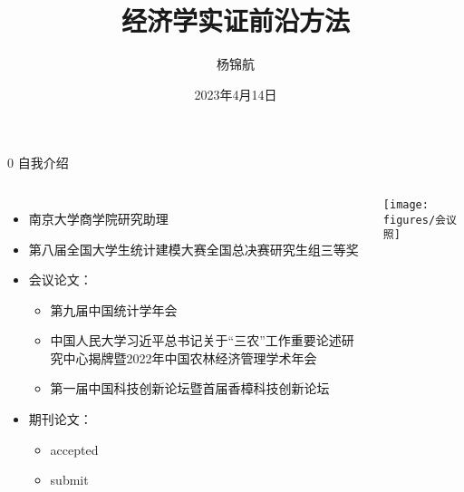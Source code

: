 \documentclass{beamer}%
\title[首届研究生学术文化节]{经济学实证前沿方法}
\author{\noindent 杨锦航}
\institute[研2101]
{
	\noindent 天津财经大学统计学院\\
	\medskip
	\noindent \textit{ y\_jinhang@stu.tjufe.edu.cn}
}
\date{\noindent 2023年4月14日}
\begin{document}
	\begin{frame}
        \setlength{\parindent}{0pt}%
		\titlepage %
	\end{frame}

\begin{frame}[t]{0 自我介绍}
\begin{columns}[onlytextwidth]
\begin{itemize}
  \item 南京大学商学院研究助理
  \item 第八届全国大学生统计建模大赛全国总决赛研究生组三等奖
  \item 会议论文：
  \begin{itemize}
    \item 第九届中国统计学年会
    \item 中国人民大学习近平总书记关于“三农”工作重要论述研究中心揭牌暨2022年中国农林经济管理学术年会
    \item 第一届中国科技创新论坛暨首届香樟科技创新论坛
  \end{itemize}
  \item 期刊论文：
  \begin{itemize}
    \item accepted
    \item submit
  \end{itemize}
\end{itemize}
\begin{center}
	\texttt{[image: figures/会议照]}
\end{center}
\end{columns}
\end{frame}
\end{document}
